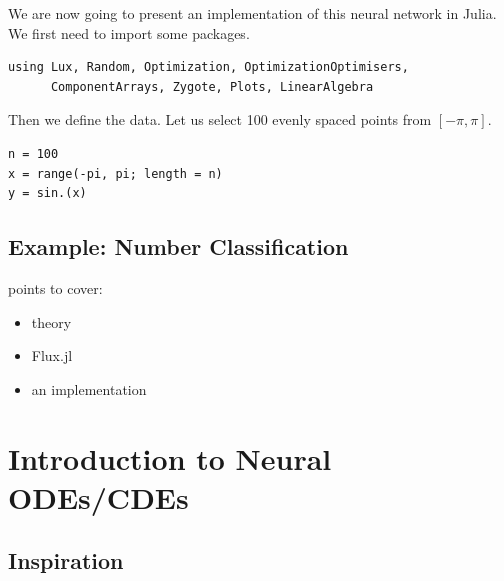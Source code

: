 \documentclass[a4paper,11pt, titlepage]{article}
\theoremstyle{definition}
\theoremstyle{plain}
\theoremstyle{remark}
\begin{document}
We are now going to present an implementation of this neural network in Julia. We first need to import some packages.

\begin{verbatim}
using Lux, Random, Optimization, OptimizationOptimisers,
      ComponentArrays, Zygote, Plots, LinearAlgebra
\end{verbatim}

Then we define the data. Let us select 100 evenly spaced points from $[-\pi, \pi]$.

\begin{verbatim}
n = 100
x = range(-pi, pi; length = n)
y = sin.(x)
\end{verbatim}

\subsection{Example: Number Classification}
points to cover:
\begin{itemize}
    \item theory
    \item Flux.jl
    \item an implementation
\end{itemize}

\section{Introduction to Neural ODEs/CDEs}

\subsection{Inspiration}
\end{document}

